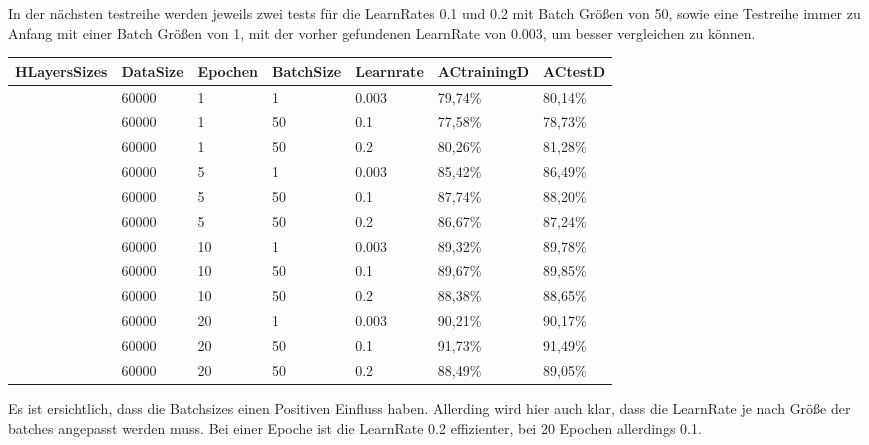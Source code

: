 \documentclass[12pt]{article}
\begin{document}
In der nächsten testreihe werden jeweils zwei tests für die LearnRates 0.1 und 0.2 mit Batch Größen von 50, sowie eine Testreihe immer zu Anfang mit einer Batch Größen von 1, mit der vorher gefundenen LearnRate von 0.003, um besser vergleichen zu können. 

\begin{table}[!ht]
    \centering
    \begin{tabular}{|l|l|l|l|l|l|l|}
    \hline
        HLayersSizes & DataSize & Epochen & BatchSize & Learnrate & ACtrainingD & ACtestD \\ \hline
        [784, 100, 10] & 60000 & 1 & 1 & 0.003 & 79,74\% & 80,14\% \\ \hline
        [784, 100, 10] & 60000 & 1 & 50 & 0.1 & 77,58\% & 78,73\% \\ \hline
        [784, 100, 10] & 60000 & 1 & 50 & 0.2 & 80,26\% & 81,28\% \\ \hline
        [784, 100, 10] & 60000 & 5 & 1 & 0.003 & 85,42\% & 86,49\% \\ \hline
        [784, 100, 10] & 60000 & 5 & 50 & 0.1 & 87,74\% & 88,20\% \\ \hline
        [784, 100, 10] & 60000 & 5 & 50 & 0.2 & 86,67\% & 87,24\% \\ \hline
        [784, 100, 10] & 60000 & 10 & 1 & 0.003 & 89,32\% & 89,78\% \\ \hline
        [784, 100, 10] & 60000 & 10 & 50 & 0.1 & 89,67\% & 89,85\% \\ \hline
        [784, 100, 10] & 60000 & 10 & 50 & 0.2 & 88,38\% & 88,65\% \\ \hline
        [784, 100, 10] & 60000 & 20 & 1 & 0.003 & 90,21\% & 90,17\% \\ \hline
        [784, 100, 10] & 60000 & 20 & 50 & 0.1 & 91,73\% & 91,49\% \\ \hline
        [784, 100, 10] & 60000 & 20 & 50 & 0.2 & 88,49\% & 89,05\% \\ \hline
    \end{tabular}
\end{table}
Es ist ersichtlich, dass die Batchsizes einen Positiven Einfluss haben. Allerding wird hier auch klar, dass die LearnRate je nach Größe der batches angepasst werden muss. Bei einer Epoche ist die LearnRate 0.2 effizienter, bei 20 Epochen allerdings 0.1. 
\end{document}
